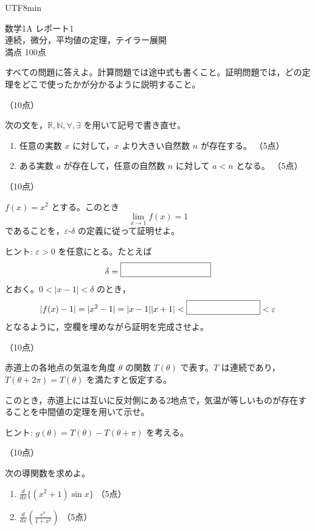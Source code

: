 \documentclass[a4paper,12pt]{article}
\newcommand{\fivepoints}{\hfill （5点）}
\newcommand{\blankbox}[1]{\fbox{\rule{0pt}{2.4ex}\hspace{#1}}}
\newcommand{\problem}[2]{\vspace{0.9em}\noindent{\large 問題#1}\hfill（#2点）\par}
\begin{document}
\ifPDFTeX
\begin{CJK}{UTF8}{min}
\fi

\begin{center}
{\Large 数学1A レポート1}\\[0.4em]
連続，微分，平均値の定理，テイラー展開\\[0.4em]
満点 100点
\end{center}

すべての問題に答えよ。計算問題では途中式も書くこと。証明問題では，どの定理をどこで使ったかが分かるように説明すること。

\problem{1}{10}

次の文を，$\mathbb{R},\mathbb{N},\forall,\exists$ を用いて記号で書き直せ。

\begin{enumerate}[label=(\alph*)]
\item 任意の実数 $x$ に対して，$x$ より大きい自然数 $n$ が存在する。 \fivepoints
\item ある実数 $a$ が存在して，任意の自然数 $n$ に対して $a<n$ となる。 \fivepoints
\end{enumerate}

\problem{2}{10}

$f(x)=x^2$ とする。このとき
\[
\lim_{x\to 1} f(x)=1
\]
であることを，$\varepsilon$-$\delta$ の定義に従って証明せよ。

ヒント: $\varepsilon>0$ を任意にとる。たとえば
\[
\delta=\blankbox{10em}
\]
とおく。$0<|x-1|<\delta$ のとき，
\[
|f(x)-1|
=|x^2-1|
=|x-1||x+1|
<\blankbox{8em}
<\varepsilon
\]
となるように，空欄を埋めながら証明を完成させよ。

\problem{3}{10}

赤道上の各地点の気温を角度 $\theta$ の関数 $T(\theta)$ で表す。$T$ は連続であり，$T(\theta+2\pi)=T(\theta)$ を満たすと仮定する。

このとき，赤道上には互いに反対側にある2地点で，気温が等しいものが存在することを中間値の定理を用いて示せ。

ヒント: $g(\theta)=T(\theta)-T(\theta+\pi)$ を考える。

\problem{4}{10}

次の導関数を求めよ。

\begin{enumerate}[label=(\alph*)]
\item $\displaystyle \frac{d}{dx}\{(x^2+1)\sin x\}$ \fivepoints
\item $\displaystyle \frac{d}{dx}\left(\frac{e^x}{1+x^2}\right)$ \fivepoints
\end{enumerate}


\end{CJK}
\end{document}
